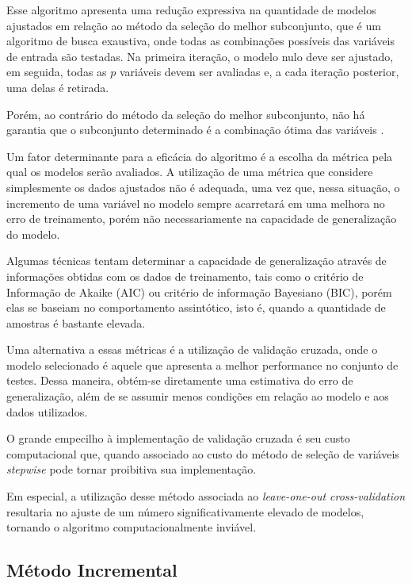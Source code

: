 \qquad

Esse algoritmo apresenta uma redução expressiva na quantidade de modelos ajustados em relação ao método da seleção do melhor subconjunto, que é um algoritmo de busca exaustiva, onde todas as combinações possíveis das variáveis de entrada são testadas. Na primeira iteração, o modelo nulo deve ser ajustado, em seguida, todas as $p$ variáveis devem ser avaliadas e, a cada iteração posterior, uma delas é retirada.

Porém, ao contrário do método da seleção do melhor subconjunto, não há garantia que o subconjunto determinado é a combinação ótima das variáveis \cite[p. 208]{intro_stat_learn}.

Um fator determinante para a eficácia do algoritmo é a escolha da métrica pela qual os modelos serão avaliados. A utilização de uma métrica que considere simplesmente os dados ajustados não é adequada, 
uma vez que, nessa situação, o incremento de uma variável no modelo sempre acarretará em uma melhora no erro de treinamento, porém não necessariamente na capacidade de generalização do modelo.

Algumas técnicas tentam determinar a capacidade de generalização através de informações obtidas com os dados de treinamento, tais como o critério de Informação de Akaike (AIC) ou critério de informação Bayesiano (BIC), porém elas se baseiam no comportamento assintótico, isto é, quando a quantidade de amostras é bastante elevada.

Uma alternativa a essas métricas é a utilização de validação cruzada, onde o modelo selecionado é aquele que apresenta a melhor performance no conjunto de testes. Dessa maneira, obtém-se diretamente uma estimativa do erro de generalização, além de se assumir menos condições em relação ao modelo e aos dados utilizados. 

O grande empecilho à implementação de validação cruzada é seu custo computacional que, quando associado ao custo do método de seleção de variáveis \textit{stepwise} pode tornar proibitiva sua implementação.

Em especial, a utilização desse método associada ao \textit{leave-one-out cross-validation} resultaria no ajuste de um número significativamente elevado de modelos, tornando o algoritmo computacionalmente inviável.

\subsection{Método Incremental}

